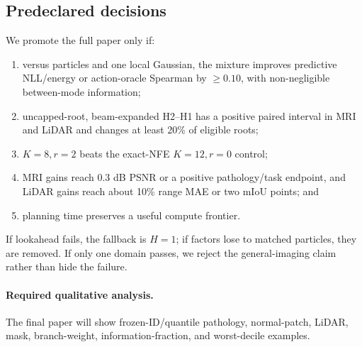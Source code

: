\subsection{Predeclared decisions}

We promote the full paper only if:
\begin{enumerate}
    \item versus particles and one local Gaussian, the mixture improves
    predictive NLL/energy or action-oracle Spearman by $\geq0.10$, with
    non-negligible between-mode information;
    \item uncapped-root, beam-expanded H2--H1 has a positive paired interval
    in MRI and LiDAR and changes at least 20\% of eligible roots;
    \item $K=8,r=2$ beats the exact-NFE $K=12,r=0$ control;
    \item MRI gains reach 0.3 dB PSNR or a positive pathology/task endpoint,
    and LiDAR gains reach about 10\% range MAE or two mIoU points; and
    \item planning time preserves a useful compute frontier.
\end{enumerate}
If lookahead fails, the fallback is $H=1$; if factors lose to matched
particles, they are removed.  If only one domain passes, we reject the
general-imaging claim rather than hide the failure.

\paragraph{Required qualitative analysis.}
The final paper will show frozen-ID/quantile pathology, normal-patch, LiDAR,
mask, branch-weight, information-fraction, and worst-decile examples.
